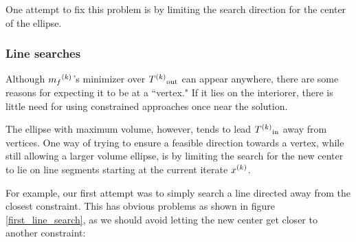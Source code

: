 One attempt to fix this problem is by limiting the search direction for the center of the ellipse.


\subsubsection{Line searches}
Although ${{m}_f}^{(k)}$'s minimizer over ${T^{(k)}}_{\text{out}}$  can appear anywhere, there are some reasons for expecting it to be at a ``vertex."
If it lies on the interiorer, there is little need for using constrained approaches once near the solution.

The ellipse with maximum volume, however, tends to lead ${T^{(k)}}_{\text{in}}$ away from vertices.
One way of trying to ensure a feasible direction towards a vertex, while still allowing a larger volume ellipse, is by limiting the search for the new center to lie on line segments starting at the current iterate ${x}^{(k)}$.

For example, our first attempt was to simply search a line directed away from the closest constraint.
This has obvious problems as shown in figure \ref{first_line_search}, as we should avoid letting the new center get closer to another constraint:

